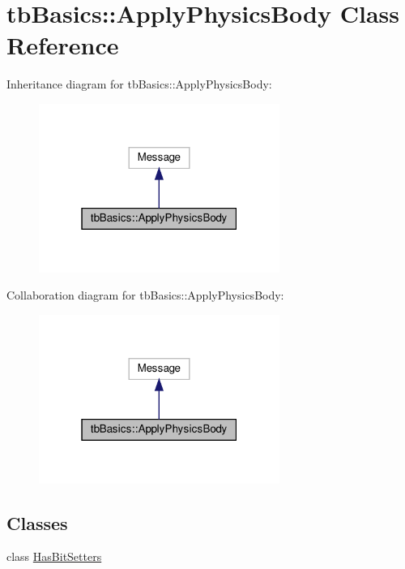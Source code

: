 \hypertarget{classtbBasics_1_1ApplyPhysicsBody}{}\section{tb\+Basics\+:\+:Apply\+Physics\+Body Class Reference}
\label{classtbBasics_1_1ApplyPhysicsBody}


Inheritance diagram for tb\+Basics\+:\+:Apply\+Physics\+Body\+:
\nopagebreak
\begin{figure}[H]
\begin{center}
\leavevmode
\includegraphics[width=223pt]{classtbBasics_1_1ApplyPhysicsBody__inherit__graph}
\end{center}
\end{figure}


Collaboration diagram for tb\+Basics\+:\+:Apply\+Physics\+Body\+:
\nopagebreak
\begin{figure}[H]
\begin{center}
\leavevmode
\includegraphics[width=223pt]{classtbBasics_1_1ApplyPhysicsBody__coll__graph}
\end{center}
\end{figure}
\subsection*{Classes}
\begin{DoxyCompactItemize}
\item 
class \hyperlink{classtbBasics_1_1ApplyPhysicsBody_1_1HasBitSetters}{Has\+Bit\+Setters}
\end{DoxyCompactItemize}
